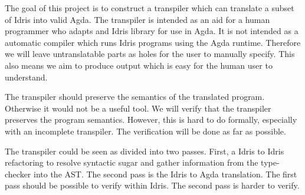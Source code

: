 The goal of this project is to construct a transpiler which can translate
a subset of Idris into valid Agda. The transpiler is intended as an aid for
a human programmer who adapts and Idris library for use in Agda.  It is not
intended as a automatic compiler which runs Idris programs using the Agda
runtime. Therefore we will leave untranslatable parts as holes for the user to
manually specify. This also means we aim to produce output which is easy for
the human user to understand.



The transpiler should preserve the semantics of the translated program.
Otherwise it would not be a useful tool.  We will verify that the transpiler
preserves the program semantics.  However, this is hard to do formally,
especially with an incomplete transpiler.  The verification will be done as far
as possible.


The transpiler could be seen as divided into two passes. First, a Idris to
Idris refactoring to resolve syntactic sugar and gather information from the
type-checker into the AST. The second pass is the Idris to Agda translation.
The first pass should be possible to verify within Idris. The second pass is
harder to verify.



